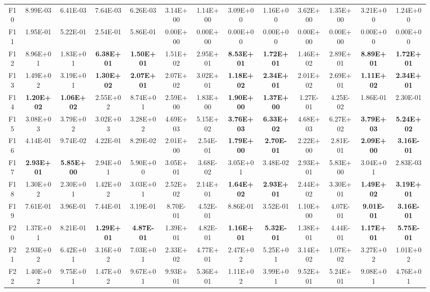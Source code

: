 \begin{table*}[!ht]
\begin{tabular}{|c|cc|cc|cc|cc|cc|cc|}
    F10   & 8.99E-03 & 6.41E-03 & 7.64E-03 & 6.26E-03 & 3.14E+00 & 1.14E+00 & 3.09E+00 & 1.16E+00 & 3.62E+00 & 1.35E+00 & 3.21E+00 & 1.24E+00 \\
    F11   & 1.95E-01 & 5.22E-01 & 2.54E-01 & 5.86E-01 & 0.00E+00 & 0.00E+00 & 0.00E+00 & 0.00E+00 & 0.00E+00 & 0.00E+00 & 0.00E+00 & 0.00E+00 \\
    F12   & 8.96E+01 & 1.83E+01 & \textbf{6.38E+01} & \textbf{1.50E+01} & 1.51E+02 & 2.95E+01 & \textbf{8.53E+01} & \textbf{1.72E+01} & 1.46E+02 & 2.89E+01 & \textbf{8.89E+01} & \textbf{1.72E+01} \\
    F13   & 1.49E+02 & 3.19E+01 & \textbf{1.30E+02} & \textbf{2.07E+01} & 2.07E+02 & 3.02E+01 & \textbf{1.18E+02} & \textbf{2.34E+01} & 2.01E+02 & 2.69E+01 & \textbf{1.11E+02} & \textbf{2.34E+01} \\
    F14   & \textbf{1.20E+02} & \textbf{1.06E+02} & 2.55E+02 & 8.74E+01 & 2.59E+00 & 1.83E+00 & \textbf{1.90E+00} & \textbf{1.37E+00} & 1.27E-01 & 4.25E-02 & 1.86E-01 & 2.30E-01 \\
    F15   & 3.08E+03 & 3.79E+02 & 3.02E+03 & 3.28E+02 & 4.69E+03 & 5.15E+02 & \textbf{3.76E+03} & \textbf{6.33E+02} & 4.68E+03 & 6.27E+02 & \textbf{3.79E+03} & \textbf{5.24E+02} \\
    F16   & 4.14E-01 & 9.74E-02 & 4.22E-01 & 8.29E-02 & 2.01E+00 & 2.54E-01 & \textbf{1.79E+00} & \textbf{2.70E-01} & 2.22E+00 & 2.81E-01 & \textbf{2.09E+00} & \textbf{3.16E-01} \\
    F17   & \textbf{2.93E+01} & \textbf{5.85E+00} & 2.94E+01 & 5.90E+00 & 3.05E+01 & 3.68E-02 & 3.05E+01 & 3.48E-02 & 2.93E+01 & 5.83E+00 & 3.04E+01 & 2.83E-03 \\
    F18   & 1.30E+02 & 2.30E+01 & 1.42E+02 & 3.03E+01 & 2.52E+02 & 2.14E+01 & \textbf{1.64E+02} & \textbf{2.93E+01} & 2.44E+02 & 3.30E+01 & \textbf{1.49E+02} & \textbf{3.19E+01} \\
    F19   & 7.61E-01 & 3.96E-01 & 7.44E-01 & 3.19E-01 & 8.70E-01 & 4.52E-01 & 8.86E-01 & 3.52E-01 & 1.10E+00 & 4.07E-01 & \textbf{9.01E-01} & \textbf{3.16E-01} \\
    F20   & 1.37E+01 & 8.21E-01 & \textbf{1.29E+01} & \textbf{4.87E-01} & 1.39E+01 & 4.82E-01 & \textbf{1.16E+01} & \textbf{5.32E-01} & 1.38E+01 & 4.44E-01 & \textbf{1.17E+01} & \textbf{5.75E-01} \\
    \hline
    F21   & 2.93E+02 & 6.42E+01 & 3.16E+02 & 7.03E+01 & 2.33E+02 & 4.77E+01 & 2.47E+02 & 5.25E+01 & 3.14E+02 & 1.07E+02 & 3.27E+02 & 1.01E+02 \\
    F22   & 1.40E+02 & 9.75E+01 & 1.47E+02 & 9.67E+01 & 9.93E+01 & 5.36E+01 & 1.11E+02 & 3.99E+01 & 9.52E+01 & 5.24E+01 & 9.08E+01 & 4.76E+01 \\

\end{tabular}
\end{table*}
